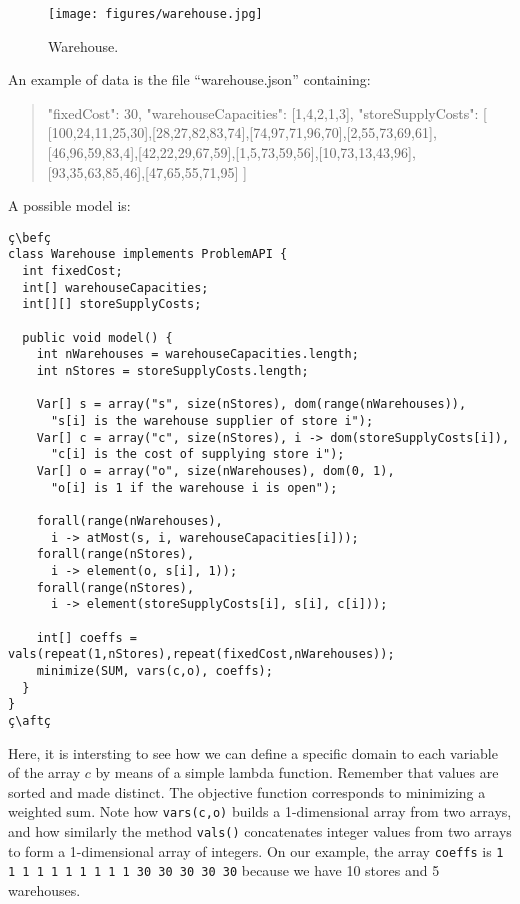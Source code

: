 \documentclass[10pt]{article}
\newcommand{\nn}[1]{{\tt #1}} %
\newenvironment{myvb}{\endgraf\small\verbatim}{\endverbatim}
\def\bef{\rule{10cm}{0.1mm}} %
\def\aft{\rule{10cm}{0.1mm}\medskip}
\begin{document}
\begin{figure}[h]
\begin{center}
  \texttt{[image: figures/warehouse.jpg]}
\end{center}
\caption{Warehouse.\label{fig:warehouse}}
\end{figure}

An example of data is the file ``warehouse.json'' containing:

{\small
  \begin{quote}
\begin{myvb}
{
  "fixedCost": 30,
  "warehouseCapacities": [1,4,2,1,3],
  "storeSupplyCosts": [
    [100,24,11,25,30],[28,27,82,83,74],[74,97,71,96,70],[2,55,73,69,61],
    [46,96,59,83,4],[42,22,29,67,59],[1,5,73,59,56],[10,73,13,43,96],
    [93,35,63,85,46],[47,65,55,71,95]
  ]
}
\end{myvb}
\end{quote}
}

A possible model is:

\begin{lstlisting}
ç\befç
class Warehouse implements ProblemAPI {
  int fixedCost;
  int[] warehouseCapacities;
  int[][] storeSupplyCosts;
  
  public void model() {
    int nWarehouses = warehouseCapacities.length;
    int nStores = storeSupplyCosts.length;
    
    Var[] s = array("s", size(nStores), dom(range(nWarehouses)),
      "s[i] is the warehouse supplier of store i");
    Var[] c = array("c", size(nStores), i -> dom(storeSupplyCosts[i]),
      "c[i] is the cost of supplying store i");
    Var[] o = array("o", size(nWarehouses), dom(0, 1),
      "o[i] is 1 if the warehouse i is open");
    
    forall(range(nWarehouses),
      i -> atMost(s, i, warehouseCapacities[i]));
    forall(range(nStores),
      i -> element(o, s[i], 1));
    forall(range(nStores),
      i -> element(storeSupplyCosts[i], s[i], c[i]));

    int[] coeffs = vals(repeat(1,nStores),repeat(fixedCost,nWarehouses));
    minimize(SUM, vars(c,o), coeffs); 
  }
}
ç\aftç
\end{lstlisting}

Here, it is intersting to see how we can define a specific domain to each variable of the array $c$ by means of a simple lambda function.
Remember that values are sorted and made distinct. 
The objective function corresponds to minimizing a weighted sum.
Note how \verb!vars(c,o)! builds a 1-dimensional array from two arrays, and how similarly the method \nn{vals()} concatenates integer values from two arrays to form a 1-dimensional array of integers.
On our example, the array \texttt{coeffs} is \verb!1 1 1 1 1 1 1 1 1 1 30 30 30 30 30! because we have 10 stores and 5 warehouses.
\end{document}
